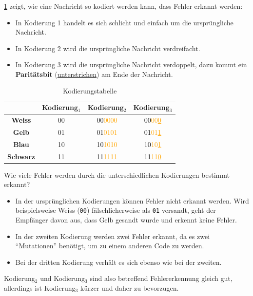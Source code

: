 \begin{myexample}\label{ex:code-kerk}
\cref{tab:codes} zeigt, wie eine Nachricht so kodiert werden kann, dass Fehler erkannt werden:
\begin{itemize}
\item In Kodierung 1 handelt es sich schlicht und einfach um die ursprüngliche Nachricht.
\item In Kodierung 2 wird die ursprüngliche Nachricht verdreifacht.
\item In Kodierung 3 wird die ursprüngliche Nachricht verdoppelt, dazu kommt ein \textbf{Paritätsbit} (\underline{unterstrichen}) am Ende der Nachricht.
\end{itemize}
\begin{table}[H]
    \centering
    \begin{tabular}{c|c|c|c}
        & \textbf{Kodierung$_1$} & \textbf{Kodierung$_2$} & \textbf{Kodierung$_3$} \\
        \midrule\midrule
        \textbf{Weiss} & 00 & 00\textcolor{orange}{0000} & 00\textcolor{orange}{00\underline{0}} \\
        \midrule
        \textbf{Gelb} & 01 & 01\textcolor{orange}{0101} & 01\textcolor{orange}{01\underline{1}} \\
		\midrule
        \textbf{Blau} & 10 & 10\textcolor{orange}{1010} & 10\textcolor{orange}{10\underline{1}} \\
        \midrule
        \textbf{Schwarz} & 11 & 11\textcolor{orange}{1111} & 11\textcolor{orange}{11\underline{0}} \\
    \end{tabular}
    \caption{Kodierungstabelle}
    \label{tab:codes}
\end{table}

Wie viele Fehler werden durch die unterschiedlichen Kodierungen bestimmt erkannt?
\begin{itemize}
\item In der ursprünglichen Kodierungen können Fehler nicht erkannt werden. Wird beispielsweise Weiss (\texttt{00}) fälschlicherweise als \texttt{01} versandt, geht der Empfänger davon aus, dass Gelb gesandt wurde und erkennt keine Fehler.
\item In der zweiten Kodierung werden zwei Fehler erkannt, da es zwei \enquote{Mutationen} benötigt, um zu einem anderen Code zu werden.
\item Bei der dritten Kodierung verhält es sich ebenso wie bei der zweiten.
\end{itemize}
Kodierung$_2$ und Kodierung$_3$ sind also betreffend Fehlererkennung gleich gut, allerdings ist Kodierung$_3$ kürzer und daher zu bevorzugen.
\end{myexample}

